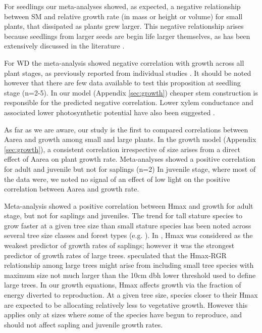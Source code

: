 \documentclass[a4paper,11pt]{article}
\begin{document}
For seedlings our meta-analyses showed, as expected, a negative relationship between SM and relative growth rate (in mass or height or volume) for small plants, that dissipated as plants grew larger. This negative relationship arises because seedlings from larger seeds are begin life larger themselves, as has been extensively discussed in the literature \citep[reviewed by][]{Turnbull:2012ew}. 

For WD the meta-analysis showed negative correlation with growth across all plant stages, as previously reported from individual studies \citep{Wright:2010tp,Ruger:2012jv}. It should be noted however that there are few data available to test this proposition at seedling stage (n=2-5). In our model (Appendix \ref{sec:growth}) cheaper stem construction is responsible for the predicted negative correlation. Lower xylem conductance and associated lower photosynthetic potential have also been suggested \citep[reviewed by][]{Chave:2009iy}.

As far as we are aware, our study is the first to compared correlations between Aarea and growth among small and large plants. In the growth model (Appendix \ref{sec:growth}), a consistent correlation irrespective of size arises from a direct effect of Aarea on plant growth rate. Meta-analyses showed a positive correlation for adult and juvenile but not for saplings (n=2) In juvenile stage, where most of the data were, we noted no signal of an effect of low light on the positive correlation between Aarea and growth rate.

Meta-analysis showed a positive correlation between Hmax and growth for adult stage, but not for saplings and juveniles. The trend for tall stature species to grow faster at a given tree size than small stature species has been noted across several tree size classes and forest types (e.g. \citealt{Poorter:2008iu,Wright:2010tp,Herault:2011dd,Ruger:2012jv,Iida:2014ep}). In \citet{Wright:2010tp}, Hmax was considered as the weakest predictor of growth rates of saplings; however it was the strongest predictor of growth rates of large trees. \citet{Poorter:2008iu} speculated that the Hmax-RGR relationship among large trees might arise from including small tree species with maximum size not much larger than the  10cm dbh lower threshold used to define large trees. In our growth equations, Hmax affects growth via the fraction of energy diverted to reproduction. At a given tree size, species closer to their Hmax are expected to be allocating relatively less to vegetative growth. However this applies only at sizes where some of the species have begun to reproduce, and should not affect sapling and juvenile growth rates.
\end{document}
